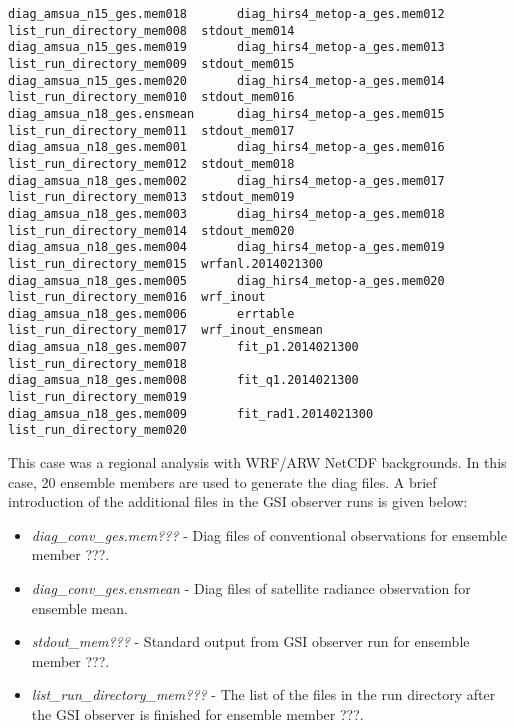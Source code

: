 \begin{scriptsize}
\begin{verbatim}
diag_amsua_n15_ges.mem018       diag_hirs4_metop-a_ges.mem012   list_run_directory_mem008  stdout_mem014
diag_amsua_n15_ges.mem019       diag_hirs4_metop-a_ges.mem013   list_run_directory_mem009  stdout_mem015
diag_amsua_n15_ges.mem020       diag_hirs4_metop-a_ges.mem014   list_run_directory_mem010  stdout_mem016
diag_amsua_n18_ges.ensmean      diag_hirs4_metop-a_ges.mem015   list_run_directory_mem011  stdout_mem017
diag_amsua_n18_ges.mem001       diag_hirs4_metop-a_ges.mem016   list_run_directory_mem012  stdout_mem018
diag_amsua_n18_ges.mem002       diag_hirs4_metop-a_ges.mem017   list_run_directory_mem013  stdout_mem019
diag_amsua_n18_ges.mem003       diag_hirs4_metop-a_ges.mem018   list_run_directory_mem014  stdout_mem020
diag_amsua_n18_ges.mem004       diag_hirs4_metop-a_ges.mem019   list_run_directory_mem015  wrfanl.2014021300
diag_amsua_n18_ges.mem005       diag_hirs4_metop-a_ges.mem020   list_run_directory_mem016  wrf_inout
diag_amsua_n18_ges.mem006       errtable                        list_run_directory_mem017  wrf_inout_ensmean
diag_amsua_n18_ges.mem007       fit_p1.2014021300               list_run_directory_mem018
diag_amsua_n18_ges.mem008       fit_q1.2014021300               list_run_directory_mem019
diag_amsua_n18_ges.mem009       fit_rad1.2014021300             list_run_directory_mem020
\end{verbatim}
\end{scriptsize}

This case was a regional analysis with WRF/ARW NetCDF backgrounds. In this case, 20 ensemble members are used to generate the diag files. A brief introduction of the additional files in the GSI observer runs is given below:


\begin{itemize}[itemindent=-15pt]
\item \textit{diag\_conv\_ges.mem???}  - Diag files of conventional observations for ensemble member ???.
\item \textit{diag\_conv\_ges.ensmean}  - Diag files of satellite radiance observation for ensemble mean.
\item \textit{stdout\_mem???}  - Standard output from GSI observer run for ensemble member ???.
\item \textit{list\_run\_directory\_mem???} - The list of the files in the run directory after the GSI observer is finished for ensemble member ???.
\end{itemize}



